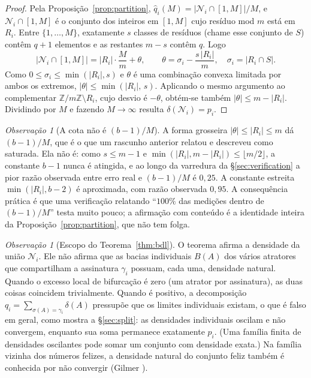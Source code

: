 \documentclass[11pt]{article}
\theoremstyle{definition}
\theoremstyle{remark}
\newtheorem{remark}[theorem]{Observação}
\begin{document}
\begin{proof}
Pela Proposição~\ref{prop:partition}, $\hat q_i(M) = |\mathcal{N}_i \cap [1,M]|/M$, e $\mathcal{N}_i \cap [1,M]$ é o conjunto dos inteiros em $[1,M]$ cujo resíduo mod $m$ está em $R_i$. Entre $\{1,\dots,M\}$, exatamente $s$ classes de resíduos (chame esse conjunto de $S$) contêm $q+1$ elementos e as restantes $m-s$ contêm $q$. Logo
\[
\big| \mathcal{N}_i \cap [1,M] \big| = |R_i| \cdot \frac{M}{m} + \theta, \qquad \theta = \sigma_i - \frac{s\,|R_i|}{m}, \quad \sigma_i = |R_i \cap S|.
\]
Como $0 \le \sigma_i \le \min(|R_i|, s)$ e $\theta$ é uma combinação convexa limitada por ambos os extremos, $|\theta| \le \min(|R_i|,\, s)$. Aplicando o mesmo argumento ao complementar $\mathbb{Z}/m\mathbb{Z} \setminus R_i$, cujo desvio é $-\theta$, obtém-se também $|\theta| \le m - |R_i|$. Dividindo por $M$ e fazendo $M \to \infty$ resulta $\delta(\mathcal{N}_i) = p_i$.
\end{proof}

\begin{remark}[A cota não é $(b-1)/M$]\label{rem:sharp}
A forma grosseira $|\theta| \le |R_i| \le m$ dá $(b-1)/M$, que é o que um rascunho anterior relatou e descreveu como saturada. Ela não é: como $s \le m-1$ e $\min(|R_i|, m-|R_i|) \le \lfloor m/2 \rfloor$, a constante $b-1$ nunca é atingida, e ao longo da varredura da \S\ref{sec:verification} a pior razão observada entre erro real e $(b-1)/M$ é $0{,}25$. A constante estreita $\min(|R_i|, b-2)$ é aproximada, com razão observada $0{,}95$. A consequência prática é que uma verificação relatando ``$100\%$ das medições dentro de $(b-1)/M$'' testa muito pouco; a afirmação com conteúdo é a identidade inteira da Proposição~\ref{prop:partition}, que não tem folga.
\end{remark}

\begin{remark}[Escopo do Teorema~\ref{thm:bdl}]\label{rem:scope}
O teorema afirma a densidade da união $\mathcal{N}_i$. Ele não afirma que as bacias individuais $B(A)$ dos vários atratores que compartilham a assinatura $\gamma_i$ possuam, cada uma, densidade natural. Quando o excesso local de bifurcação é zero (um atrator por assinatura), as duas coisas coincidem trivialmente. Quando é positivo, a decomposição $q_i = \sum_{\sigma(A)=\gamma_i} \delta(A)$ pressupõe que os limites individuais existam, o que é falso em geral, como mostra a \S\ref{sec:split}: as densidades individuais oscilam e não convergem, enquanto sua soma permanece exatamente $p_i$. (Uma família finita de densidades oscilantes pode somar um conjunto com densidade exata.) Na família vizinha dos números felizes, a densidade natural do conjunto feliz também é conhecida por não convergir (Gilmer \cite{gilmer}).
\end{remark}
\end{document}
